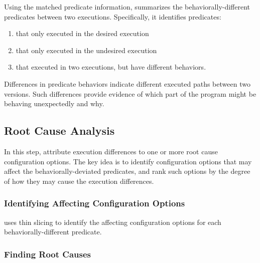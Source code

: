 Using the matched predicate information, \ourtool 
summarizes the behaviorally-different predicates between
two executions. Specifically, it identifies predicates:

\begin{enumerate}
\item that only executed in the desired execution
\item that only executed in the undesired execution
\item that executed in two executions, but have
different behaviors. 
\end{enumerate}

Differences in predicate behaviors indicate different executed paths
between two versions. Such differences provide evidence of
which part of the program might be behaving unexpectedly and why.



\subsection{Root Cause Analysis}
\label{sec:rootcause}


In this step, \ourtool attribute execution differences
to one or more root cause configuration options.
The key idea is to identify configuration options that
may affect the behaviorally-deviated predicates, and rank
such options by the degree of how they may cause
the execution differences.

\subsubsection{Identifying Affecting Configuration Options}

\ourtool uses thin slicing to identify the affecting
configuration options for each behaviorally-different predicate.



\subsubsection{Finding Root Causes}

